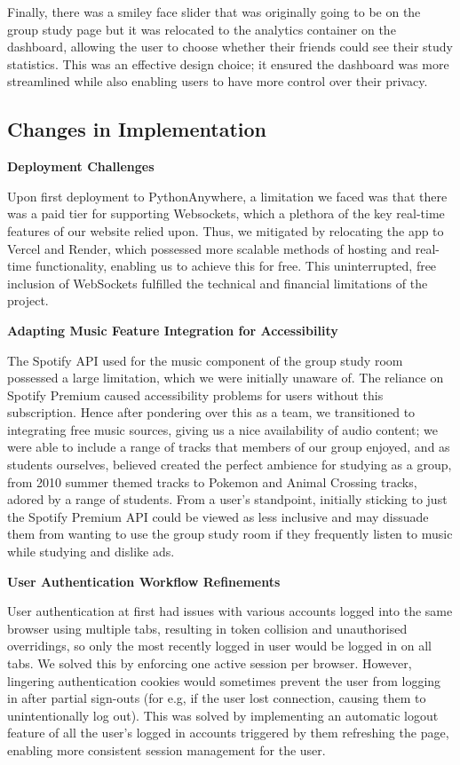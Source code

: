 Finally, there was a smiley face slider that was originally going to be on the group study page but it was relocated to the analytics container on the dashboard, allowing the user to choose whether their friends could see their study statistics. This was an effective design choice; it ensured the dashboard was more streamlined while also enabling users to have more control over their privacy. 

\subsection{Changes in Implementation}
\textbf{Deployment Challenges} 

Upon first deployment to PythonAnywhere, a limitation we faced was that there was a paid tier for supporting Websockets, which a plethora of the key real-time features of our website relied upon. Thus, we mitigated by relocating the app to Vercel and Render, which possessed more scalable methods of hosting and real-time functionality, enabling us to achieve this for free. This uninterrupted, free inclusion of WebSockets fulfilled the technical and financial limitations of the project.

\textbf{Adapting Music Feature Integration for Accessibility}

The Spotify API used for the music component of the group study room possessed a large limitation, which we were initially unaware of. The reliance on Spotify Premium caused accessibility problems for users without this subscription. Hence after pondering over this as a team, we transitioned to integrating free music sources, giving us a nice availability of audio content; we were able to include a range of tracks that members of our group enjoyed, and as students ourselves, believed created the perfect ambience for studying as a group, from 2010 summer themed tracks to Pokemon and Animal Crossing tracks, adored by a range of students. From a user's standpoint, initially sticking to just the Spotify Premium API could be viewed as less inclusive and may dissuade them from wanting to use the group study room if they frequently listen to music while studying and dislike ads.

\textbf{User Authentication Workflow Refinements}

User authentication at first had issues with various accounts logged into the same browser using multiple tabs, resulting in token collision and unauthorised overridings, so only the most recently logged in user would be logged in on all tabs. We solved this by enforcing one active session per browser. However, lingering authentication cookies would sometimes prevent the user from logging in after partial sign-outs (for e.g, if the user lost connection, causing them to unintentionally log out). This was solved by implementing an automatic logout feature of all the user's logged in accounts triggered by them refreshing the page, enabling more consistent session management for the user.

